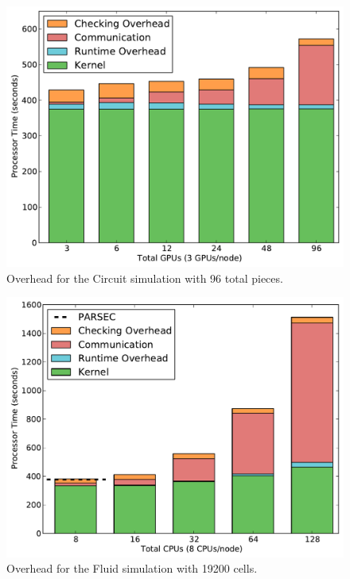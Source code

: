 \begin{figure}
\begin{center}
\includegraphics[scale=0.30]{figs/circuit_96_popl.pdf}
\end{center}
\vspace{-2mm}
\caption{Overhead for the Circuit simulation with 96 total pieces.\label{fig:ckt_overhead}}
\vspace{-5mm}
\end{figure}

\begin{figure}
\begin{center}
\includegraphics[scale=0.30]{figs/fluid_19200_popl.pdf}
\end{center}
\vspace{-2mm}
\caption{Overhead for the Fluid simulation with 19200 cells.\label{fig:fluid_overhead}}
\vspace{-5mm}
\end{figure}

